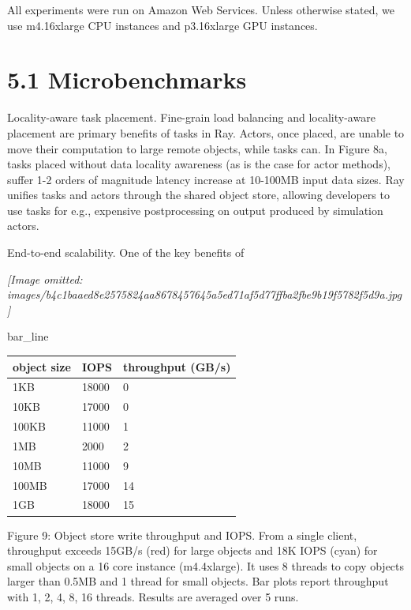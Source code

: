 \documentclass[
]{article}
\newcounter{none} %
\begin{document}
All experiments were run on Amazon Web Services. Unless otherwise
stated, we use m4.16xlarge CPU instances and p3.16xlarge GPU instances.

\section{5.1 Microbenchmarks}\label{microbenchmarks}

Locality-aware task placement. Fine-grain load balancing and
locality-aware placement are primary benefits of tasks in Ray. Actors,
once placed, are unable to move their computation to large remote
objects, while tasks can. In Figure 8a, tasks placed without data
locality awareness (as is the case for actor methods), suffer 1-2 orders
of magnitude latency increase at 10-100MB input data sizes. Ray unifies
tasks and actors through the shared object store, allowing developers to
use tasks for e.g., expensive postprocessing on output produced by
simulation actors.

End-to-end scalability. One of the key benefits of

\textit{[Image omitted: images/b4c1baaed8e2575824aa8678457645a5ed71af5d77ffba2fbe9b19f5782f5d9a.jpg]}

bar\_line

{\def\LTcaptype{none} %
\begin{longtable}[]{@{}lll@{}}
\toprule\noalign{}
object size & IOPS & throughput (GB/s) \\
\midrule\noalign{}
\endhead
\bottomrule\noalign{}
\endlastfoot
1KB & 18000 & 0 \\
10KB & 17000 & 0 \\
100KB & 11000 & 1 \\
1MB & 2000 & 2 \\
10MB & 11000 & 9 \\
100MB & 17000 & 14 \\
1GB & 18000 & 15 \\
\end{longtable}
}

Figure 9: Object store write throughput and IOPS. From a single client,
throughput exceeds 15GB/s (red) for large objects and 18K IOPS (cyan)
for small objects on a 16 core instance (m4.4xlarge). It uses 8 threads
to copy objects larger than 0.5MB and 1 thread for small objects. Bar
plots report throughput with 1, 2, 4, 8, 16 threads. Results are
averaged over 5 runs.
\end{document}
